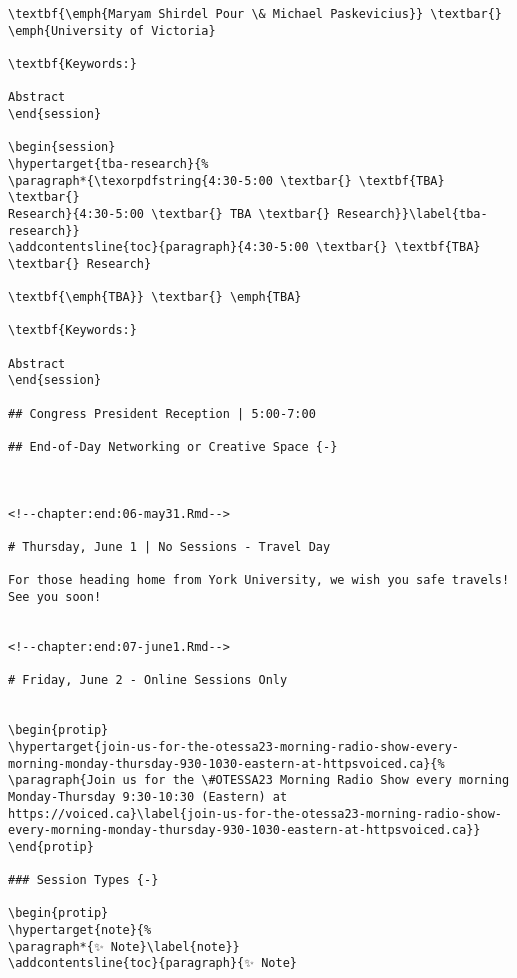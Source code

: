 \documentclass[
]{book}
\begin{document}
\begin{verbatim}
\textbf{\emph{Maryam Shirdel Pour \& Michael Paskevicius}} \textbar{}
\emph{University of Victoria}

\textbf{Keywords:}

Abstract
\end{session}

\begin{session}
\hypertarget{tba-research}{%
\paragraph*{\texorpdfstring{4:30-5:00 \textbar{} \textbf{TBA} \textbar{}
Research}{4:30-5:00 \textbar{} TBA \textbar{} Research}}\label{tba-research}}
\addcontentsline{toc}{paragraph}{4:30-5:00 \textbar{} \textbf{TBA}
\textbar{} Research}

\textbf{\emph{TBA}} \textbar{} \emph{TBA}

\textbf{Keywords:}

Abstract
\end{session}

## Congress President Reception | 5:00-7:00

## End-of-Day Networking or Creative Space {-}



<!--chapter:end:06-may31.Rmd-->

# Thursday, June 1 | No Sessions - Travel Day 

For those heading home from York University, we wish you safe travels! See you soon!


<!--chapter:end:07-june1.Rmd-->

# Friday, June 2 - Online Sessions Only


\begin{protip}
\hypertarget{join-us-for-the-otessa23-morning-radio-show-every-morning-monday-thursday-930-1030-eastern-at-httpsvoiced.ca}{%
\paragraph{Join us for the \#OTESSA23 Morning Radio Show every morning
Monday-Thursday 9:30-10:30 (Eastern) at
https://voiced.ca}\label{join-us-for-the-otessa23-morning-radio-show-every-morning-monday-thursday-930-1030-eastern-at-httpsvoiced.ca}}
\end{protip}

### Session Types {-}

\begin{protip}
\hypertarget{note}{%
\paragraph*{✨ Note}\label{note}}
\addcontentsline{toc}{paragraph}{✨ Note}


\end{verbatim}
\end{document}
